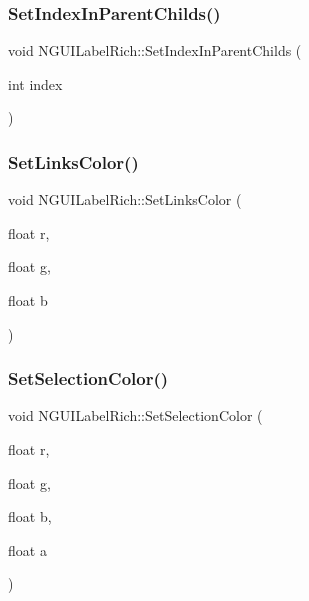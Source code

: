 \subsubsection{\texorpdfstring{Set\+Index\+In\+Parent\+Childs()}{SetIndexInParentChilds()}}
{\footnotesize\ttfamily void N\+G\+U\+I\+Label\+Rich\+::\+Set\+Index\+In\+Parent\+Childs (\begin{DoxyParamCaption}\item[{int}]{index }\end{DoxyParamCaption})}

\hypertarget{class_n_g_u_i_label_rich_ae585684d6041e843d947969a193f0dbe}{}\label{class_n_g_u_i_label_rich_ae585684d6041e843d947969a193f0dbe} 
\subsubsection{\texorpdfstring{Set\+Links\+Color()}{SetLinksColor()}}
{\footnotesize\ttfamily void N\+G\+U\+I\+Label\+Rich\+::\+Set\+Links\+Color (\begin{DoxyParamCaption}\item[{float}]{r,  }\item[{float}]{g,  }\item[{float}]{b }\end{DoxyParamCaption})}

\hypertarget{class_n_g_u_i_label_rich_ae9f14bc658c7d8be270481642471024c}{}\label{class_n_g_u_i_label_rich_ae9f14bc658c7d8be270481642471024c} 
\subsubsection{\texorpdfstring{Set\+Selection\+Color()}{SetSelectionColor()}}
{\footnotesize\ttfamily void N\+G\+U\+I\+Label\+Rich\+::\+Set\+Selection\+Color (\begin{DoxyParamCaption}\item[{float}]{r,  }\item[{float}]{g,  }\item[{float}]{b,  }\item[{float}]{a }\end{DoxyParamCaption})}

